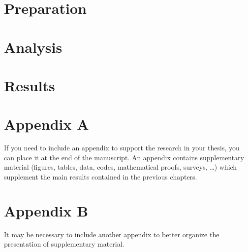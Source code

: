 \documentclass{polimi_template_classic/PoliMi3i_thesis}
\begin{document}
\chapter{Preparation} %



\chapter{Analysis} %




\chapter{Results} %




\nocite{*} %
\printbibliography


\cleardoublepage
{} %
\appendix
\chapter{Appendix A}
If you need to include an appendix to support the research in your thesis, you can place it at the end of the manuscript.
An appendix contains supplementary material (figures, tables, data, codes, mathematical proofs, surveys, \dots)
which supplement the main results contained in the previous chapters.

\chapter{Appendix B}
It may be necessary to include another appendix to better organize the presentation of supplementary material.


\listoffigures

\listoftables

\end{document}
